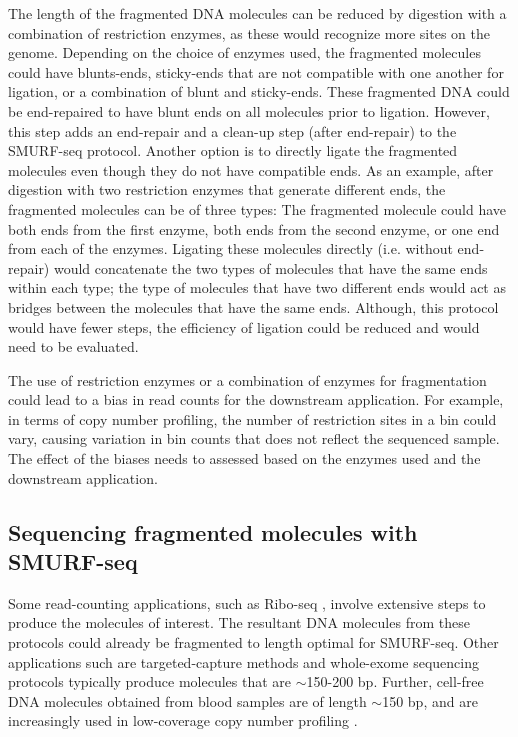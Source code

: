 The length of the fragmented DNA molecules can be reduced by digestion
with a combination of restriction enzymes, as these would recognize more
sites on the genome. Depending on the choice of enzymes used, the
fragmented molecules could have blunts-ends, sticky-ends that are not
compatible with one another for ligation, or a combination of blunt and
sticky-ends.
%
These fragmented DNA could be end-repaired to have blunt ends on all
molecules prior to ligation. However, this step adds an end-repair and a
clean-up step (after end-repair) to the SMURF-seq protocol.
%
Another option is to directly ligate the fragmented molecules even
though they do not have compatible ends. As an example, after digestion
with two restriction enzymes that generate different ends, the
fragmented molecules can be of three types: The fragmented molecule
could have both ends from the first enzyme, both ends from the second
enzyme, or one end from each of the enzymes. Ligating these molecules
directly (i.e. without end-repair) would concatenate the two types of
molecules that have the same ends within each type; the type of
molecules that have two different ends would act as bridges between the
molecules that have the same ends. Although, this protocol would have
fewer steps, the efficiency of ligation could be reduced and would need
to be evaluated.

The use of restriction enzymes or a combination of enzymes for
fragmentation could lead to a bias in read counts for the downstream
application. For example, in terms of copy number profiling, the number
of restriction sites in a bin could vary, causing variation in bin
counts that does not reflect the sequenced sample. The effect of the
biases needs to assessed based on the enzymes used and the downstream
application.


\subsection*{Sequencing fragmented molecules with SMURF-seq}
Some read-counting applications, such as Ribo-seq
\citep{ingolia2009genome}, involve extensive steps to produce the
molecules of interest. The resultant DNA molecules from these
protocols could already be fragmented to length optimal for SMURF-seq.
Other applications such are targeted-capture methods and whole-exome
sequencing protocols typically produce molecules that are $\sim$150-200
bp. Further, cell-free DNA molecules obtained from blood samples are of
length $\sim$150 bp, and are increasingly used in low-coverage copy
number profiling \citep{underhill2016fragment,
adalsteinsson2017scalable}.

